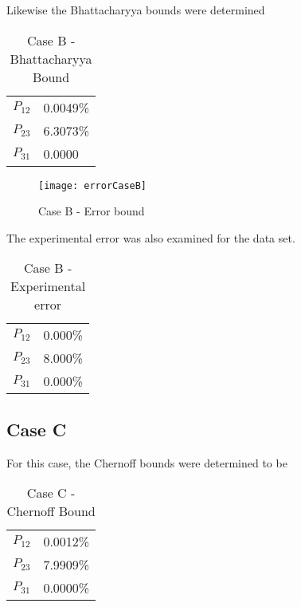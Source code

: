Likewise the Bhattacharyya bounds were determined


\begin{table}[htb!]
\begin{center}
\begin{tabular}{ll}
$P_{12}$ & 0.0049\%\\
$P_{23}$ & 6.3073\%\\
$P_{31}$ & 0.0000
\end{tabular}
\end{center}
\caption{Case B - Bhattacharyya Bound}
\label{tab: case b bhatt}
\end{table}


\begin{figure}
 \centering
 \texttt{[image: errorCaseB]}
 \caption{Case B - Error bound}
 \label{case b error}
\end{figure}


The experimental error was also examined for the data set.

\begin{table}[htb]
\begin{center}
\begin{tabular}{ll}
$P_{12}$ & 0.000\%\\
$P_{23}$ & 8.000\%\\
$P_{31}$ & 0.000\%
\end{tabular}
\end{center}
\caption{Case B - Experimental error}
\label{tab: case b experiment}
\end{table}

%

\newpage
\pagebreak

\subsection{Case C}

For this case, the Chernoff bounds were determined to be

\begin{table}[htb!]
\begin{center}
\begin{tabular}{ll}
$P_{12}$ & 0.0012\%\\
$P_{23}$ & 7.9909\%\\
$P_{31}$ & 0.0000\%
\end{tabular}
\end{center}
\caption{Case C - Chernoff Bound}
\label{tab: case c chernoff}
\end{table}

